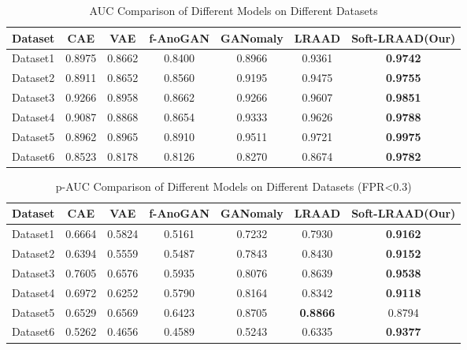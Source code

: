 \documentclass{article}
\begin{document}
\begin{table}[H]
    \centering
    \caption{AUC Comparison of Different Models on Different Datasets}
    \begin{tabular}{ccccccc}
        \toprule
        Dataset & CAE & VAE & f-AnoGAN & GANomaly & LRAAD & Soft-LRAAD(Our) \\
        \midrule
        Dataset1 & 0.8975 & 0.8662 & 0.8400 & 0.8966 & 0.9361 & \textbf{0.9742} \\
        Dataset2 & 0.8911 & 0.8652 & 0.8560 & 0.9195 & 0.9475 & \textbf{0.9755} \\
        Dataset3 & 0.9266 & 0.8958 & 0.8662 & 0.9266 & 0.9607 & \textbf{0.9851} \\
        Dataset4 & 0.9087 & 0.8868 & 0.8654 & 0.9333 & 0.9626 & \textbf{0.9788} \\
        Dataset5 & 0.8962 & 0.8965 & 0.8910 & 0.9511 & 0.9721 & \textbf{0.9975} \\
        Dataset6 & 0.8523 & 0.8178 & 0.8126 & 0.8270 & 0.8674 & \textbf{0.9782} \\
        \bottomrule
    \end{tabular}
    \label{tab:auc}
\end{table}

\begin{table}[H]
    \centering
    \caption{p-AUC Comparison of Different Models on Different Datasets (FPR<0.3)}
    \begin{tabular}{ccccccc}
        \toprule
        Dataset & CAE & VAE & f-AnoGAN & GANomaly & LRAAD & Soft-LRAAD(Our) \\
        \midrule
        Dataset1 & 0.6664 & 0.5824 & 0.5161 & 0.7232 & 0.7930 & \textbf{0.9162} \\
        Dataset2 & 0.6394 & 0.5559 & 0.5487 & 0.7843 & 0.8430 & \textbf{0.9152} \\
        Dataset3 & 0.7605 & 0.6576 & 0.5935 & 0.8076 & 0.8639 & \textbf{0.9538} \\
        Dataset4 & 0.6972 & 0.6252 & 0.5790 & 0.8164 & 0.8342 & \textbf{0.9118} \\
        Dataset5 & 0.6529 & 0.6569 & 0.6423 & 0.8705 & \textbf{0.8866} & 0.8794 \\
        Dataset6 & 0.5262 & 0.4656 & 0.4589 & 0.5243 & 0.6335 & \textbf{0.9377} \\
        \bottomrule
    \end{tabular}
    \label{tab:p-auc-03}
\end{table}
\end{document}
